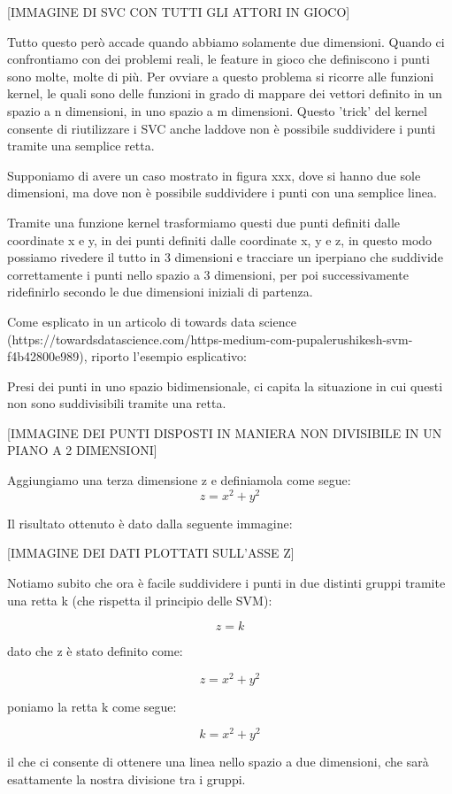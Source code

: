 \documentclass[12pt,italian]{report}
\begin{document}
[IMMAGINE DI SVC CON TUTTI GLI ATTORI IN GIOCO]

Tutto questo però accade quando abbiamo solamente due dimensioni. Quando ci confrontiamo con dei problemi reali, le feature in gioco che definiscono i punti sono molte, molte di più. Per ovviare a questo problema si ricorre alle funzioni kernel, le quali sono delle funzioni in grado di mappare dei vettori definito in un spazio a n dimensioni, in uno spazio a m dimensioni.
Questo 'trick' del kernel consente di riutilizzare i SVC anche laddove non è possibile suddividere i punti tramite una semplice retta.

Supponiamo di avere un caso mostrato in figura xxx, dove si hanno due sole dimensioni, ma dove non è possibile suddividere i punti con una semplice linea.


Tramite una funzione kernel trasformiamo questi due punti definiti dalle coordinate x e y, in dei punti definiti dalle coordinate x, y e z, in questo modo possiamo rivedere il tutto in 3 dimensioni e tracciare un iperpiano che suddivide correttamente i punti nello spazio a 3 dimensioni, per poi successivamente ridefinirlo secondo le due dimensioni iniziali di partenza.

Come esplicato in un articolo di towards data science (https://towardsdatascience.com/https-medium-com-pupalerushikesh-svm-f4b42800e989), riporto l'esempio esplicativo:

Presi dei punti in uno spazio bidimensionale, ci capita la situazione in cui questi non sono suddivisibili tramite una retta.

[IMMAGINE DEI PUNTI DISPOSTI IN MANIERA NON DIVISIBILE IN UN PIANO A 2 DIMENSIONI]

Aggiungiamo una terza dimensione z e definiamola come segue:
\[ z = x^2 + y^2 \]

Il risultato ottenuto è dato dalla seguente immagine:

[IMMAGINE DEI DATI PLOTTATI SULL'ASSE Z]

Notiamo subito che ora è facile suddividere i punti in due distinti gruppi tramite una retta k (che rispetta il principio delle SVM):

\[ z = k \]

dato che z è stato definito come:

\[ z = x^2 + y^2 \]

poniamo la retta k come segue:

\[ k = x^2 + y^2 \]

il che ci consente di ottenere una linea nello spazio a due dimensioni, che sarà esattamente la nostra divisione tra i gruppi.
\end{document}
